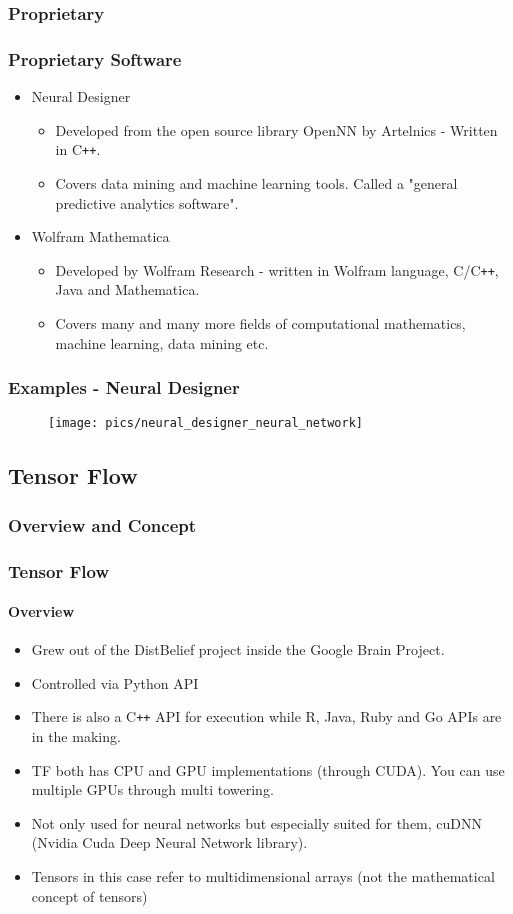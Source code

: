 \documentclass[9pt]{beamer}
\begin{document}
\subsubsection{Proprietary}
\begin{frame}
\frametitle{Proprietary Software}
\begin{itemize}
\item Neural Designer
\begin{itemize}
\item Developed from the open source library OpenNN by Artelnics - Written in C\texttt{++}.
\item Covers data mining and machine learning tools. Called a "general predictive analytics software".
\end{itemize}
\item Wolfram Mathematica
\begin{itemize}
\item Developed by Wolfram Research - written in Wolfram language, C/C\texttt{++}, Java and Mathematica.
\item Covers many and many more fields of computational mathematics, machine learning, data mining etc.
\end{itemize}
\end{itemize}
\end{frame}


\begin{frame}
\frametitle{Examples - Neural Designer}
\begin{figure}
\centering
\texttt{[image: pics/neural\_designer\_neural\_network]}
\end{figure}
\end{frame}


\subsection{Tensor Flow}
\subsubsection{Overview and Concept}
\begin{frame}
\frametitle{Tensor Flow}
\framesubtitle{Overview}
\begin{itemize}
\item Grew out of the DistBelief project inside the Google Brain Project.	
\item Controlled via Python API
\item There is also a C\texttt{++} API for execution while R, Java, Ruby and Go APIs are in the making.
\item TF both has CPU and GPU implementations (through CUDA). You can use multiple GPUs through multi towering.
\item Not only used for neural networks but especially suited for them, cuDNN (Nvidia Cuda Deep Neural Network library).
\item Tensors in  this case refer to multidimensional arrays (not the mathematical concept of tensors)
\end{itemize}
\end{frame}
\end{document}
